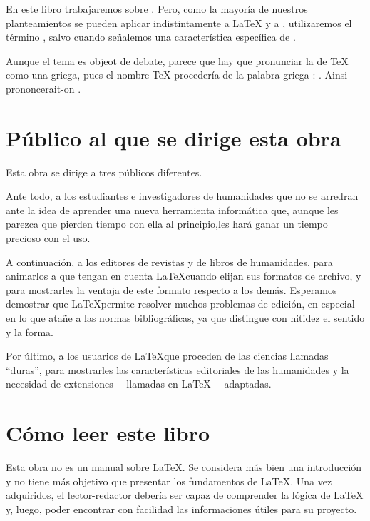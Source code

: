 En este libro trabajaremos sobre \XeLaTeX{}. Pero, como la mayoría de nuestros planteamientos se pueden aplicar indistintamente a  \LaTeX{} y a \XeLaTeX{}, utilizaremos el término \forme{\LaTeX{}}, salvo cuando señalemos una característica específica de \XeLaTeX{}.
\begin{plusloins}
Aunque el tema es objeot de debate, parece que hay que pronunciar la  de \TeX{} como una  griega, pues el nombre \TeX{} procedería de la palabra griega  : . Ainsi prononcerait-on .
\end{plusloins}


\section{Público al que se dirige esta obra}

Esta obra se dirige a tres públicos diferentes.

Ante todo, a los estudiantes e investigadores de humanidades que no se arredran ante la idea de aprender una nueva herramienta informática que, aunque les parezca que pierden tiempo con ella al principio,les hará ganar un tiempo precioso con el uso.

A continuación, a los editores de revistas y de libros de humanidades, para animarlos a que tengan en cuenta \LaTeX cuando elijan sus formatos de archivo, y para mostrarles la ventaja de este formato respecto a los demás. Esperamos demostrar que \LaTeX permite resolver muchos problemas de edición, en especial en lo que atañe a las normas bibliográficas, ya que distingue con nitidez el sentido y la forma.

Por último, a los usuarios de \LaTeX que proceden de las ciencias llamadas \enquote{duras}, para mostrarles las características editoriales de las humanidades y la necesidad de extensiones ---llamadas  en \LaTeX{}--- adaptadas.


\section{Cómo leer este libro}

Esta obra no es un manual sobre \LaTeX{}. Se considera más bien una introducción y no tiene más objetivo que presentar los fundamentos de \LaTeX{}. Una vez adquiridos, el lector-redactor debería ser capaz de comprender la lógica de \LaTeX{} y, luego, poder encontrar con facilidad las informaciones útiles para su proyecto.

